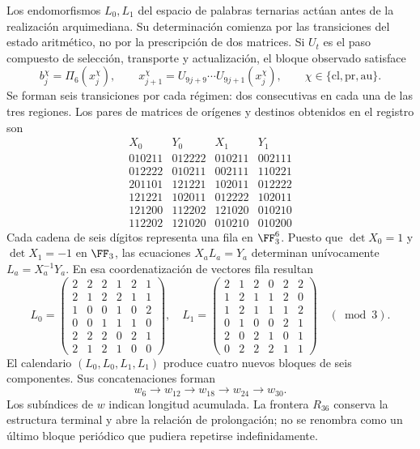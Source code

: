 Los endomorfismos \(L_0,L_1\) del espacio de palabras ternarias actúan antes de la realización arquimediana. Su determinación comienza por las transiciones del estado aritmético, no por la prescripción de dos matrices. Si \(U_t\) es el paso compuesto de selección, transporte y actualización, el bloque observado satisface
\[
 b_j^\chi=\Pi_6(x_j^\chi),\qquad
 x_{j+1}^\chi=U_{9j+9}\cdots U_{9j+1}(x_j^\chi),
 \qquad \chi\in\{\mathrm{cl},\mathrm{pr},\mathrm{au}\}.
\]
Se forman seis transiciones por cada régimen: dos consecutivas en cada una de las tres regiones. Los pares de matrices de orígenes y destinos obtenidos en el registro son
\[
\begin{array}{c|c|c|c}
X_0&Y_0&X_1&Y_1\\\hline
010211&012222&010211&002111\\
012222&010211&002111&110221\\
201101&121221&102011&012222\\
121221&102011&012222&102011\\
121200&112202&121020&010210\\
112202&121020&010210&010200
\end{array}
\]
Cada cadena de seis dígitos representa una fila en \(\FF_3^6\). Puesto que \(\det X_0=1\) y \(\det X_1=-1\) en \(\FF_3\), las ecuaciones \(X_aL_a=Y_a\) determinan unívocamente \(L_a=X_a^{-1}Y_a\). En esa coordenatización de vectores fila resultan
\[
 L_0=\begin{pmatrix}
 2&2&2&1&2&1\\2&1&2&2&1&1\\1&0&0&1&0&2\\
 0&0&1&1&1&0\\2&2&2&0&2&1\\2&1&2&1&0&0
 \end{pmatrix},\quad
 L_1=\begin{pmatrix}
 2&1&2&0&2&2\\1&2&1&1&2&0\\1&2&1&1&1&2\\
 0&1&0&0&2&1\\2&0&2&1&0&1\\0&2&2&2&1&1
 \end{pmatrix}\quad(\bmod3).
\]
El calendario \((L_0,L_0,L_1,L_1)\) produce cuatro nuevos bloques de seis componentes. Sus concatenaciones forman
\[
 w_6\longrightarrow w_{12}\longrightarrow w_{18}
 \longrightarrow w_{24}\longrightarrow w_{30}.
\]
Los subíndices de \(w\) indican longitud acumulada. La frontera \(R_{36}\) conserva la estructura terminal y abre la relación de prolongación; no se renombra como un último bloque periódico que pudiera repetirse indefinidamente.

